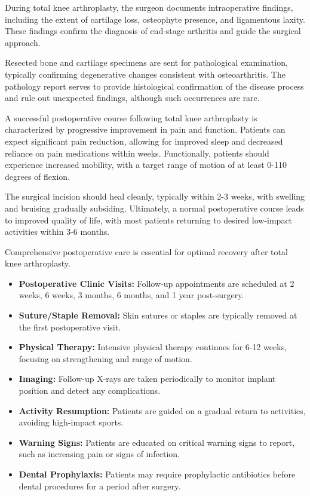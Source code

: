 During total knee arthroplasty, the surgeon documents intraoperative findings, including the extent of cartilage loss, osteophyte presence, and ligamentous laxity. These findings confirm the diagnosis of end-stage arthritis and guide the surgical approach.

Resected bone and cartilage specimens are sent for pathological examination, typically confirming degenerative changes consistent with osteoarthritis. The pathology report serves to provide histological confirmation of the disease process and rule out unexpected findings, although such occurrences are rare.

A successful postoperative course following total knee arthroplasty is characterized by progressive improvement in pain and function. Patients can expect significant pain reduction, allowing for improved sleep and decreased reliance on pain medications within weeks. Functionally, patients should experience increased mobility, with a target range of motion of at least 0-110 degrees of flexion.

The surgical incision should heal cleanly, typically within 2-3 weeks, with swelling and bruising gradually subsiding. Ultimately, a normal postoperative course leads to improved quality of life, with most patients returning to desired low-impact activities within 3-6 months.

Comprehensive postoperative care is essential for optimal recovery after total knee arthroplasty.

\begin{itemize}
  \item \textbf{Postoperative Clinic Visits:} Follow-up appointments are scheduled at 2 weeks, 6 weeks, 3 months, 6 months, and 1 year post-surgery.
  
  \item \textbf{Suture/Staple Removal:} Skin sutures or staples are typically removed at the first postoperative visit.
  
  \item \textbf{Physical Therapy:} Intensive physical therapy continues for 6-12 weeks, focusing on strengthening and range of motion.
  
  \item \textbf{Imaging:} Follow-up X-rays are taken periodically to monitor implant position and detect any complications.
  
  \item \textbf{Activity Resumption:} Patients are guided on a gradual return to activities, avoiding high-impact sports.
  
  \item \textbf{Warning Signs:} Patients are educated on critical warning signs to report, such as increasing pain or signs of infection.
  
  \item \textbf{Dental Prophylaxis:} Patients may require prophylactic antibiotics before dental procedures for a period after surgery.
\end{itemize}

